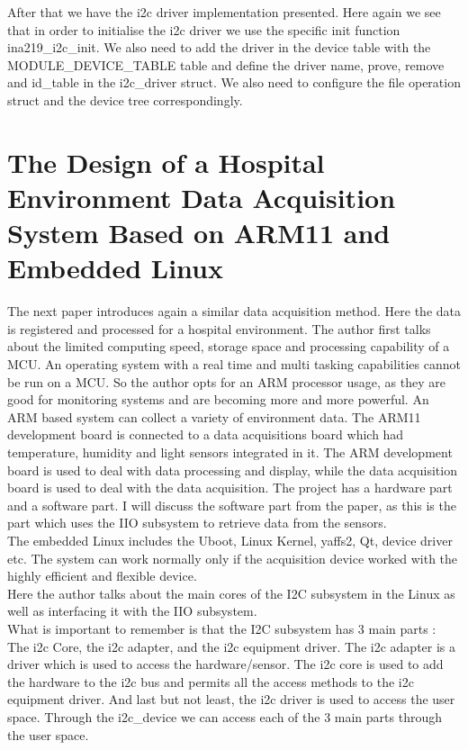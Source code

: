 \documentclass[l2pt, letterpaper]{article}
\begin{document}
After that we have the i2c driver implementation presented. Here again we see
that in order to initialise the i2c driver we use the specific init function
ina219\_i2c\_init. We also need to add the driver in the device table with the
MODULE\_DEVICE\_TABLE table and define the driver name, prove, remove and
id\_table in the i2c\_driver struct. We also need to configure the file operation
struct and the device tree correspondingly.\\

\section{The Design of a Hospital Environment Data Acquisition System Based on ARM11 and Embedded Linux}

The next paper introduces again a similar data acquisition method. Here the data
is registered and processed for a hospital environment. The author first talks
about the limited computing speed, storage space and processing capability of a
MCU. An operating system with a real time and multi tasking capabilities cannot
be run on a MCU. So the author opts for an ARM processor usage, as they are
good for monitoring systems and are becoming more and more powerful. An
ARM based system can collect a variety of environment data. The ARM11
development board is connected to a data acquisitions board which had
temperature, humidity and light sensors integrated in it. The ARM development
board is used to deal with data processing and display, while the data acquisition
board is used to deal with the data acquisition. The project has a hardware part
and a software part. I will discuss the software part from the paper, as this is the
part which uses the IIO subsystem to retrieve data from the sensors. \\

The embedded Linux includes the Uboot, Linux Kernel, yaffs2, Qt, device driver
etc. The system can work normally only if the acquisition device worked with the
highly efficient and flexible device. \\

Here the author talks about the main cores of the I2C subsystem in the Linux as
well as interfacing it with the IIO subsystem. \\

What is important to remember is that the I2C subsystem has 3 main parts : The
i2c Core, the i2c adapter, and the i2c equipment driver. The i2c adapter is a
driver which is used to access the hardware/sensor. The i2c core is used to add
the hardware to the i2c bus and permits all the access methods to the i2c
equipment driver. And last but not least, the i2c driver is used to access the user
space. Through the i2c\_device we can access each of the 3 main parts through
the user space. \\
\end{document}
